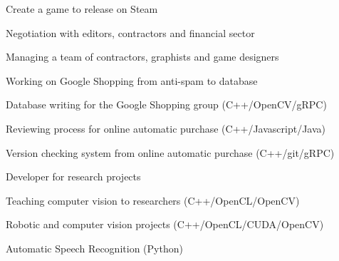 \documentclass[a4paper]{deedy-resume} %
\begin{document}
\begin{minipage}[t]{0.66\textwidth}
	Create a game to release on Steam
	\begin{tightitemize}
		\item Negotiation with editors, contractors and financial sector
		\item Managing a team of contractors, graphists and game designers
	\end{tightitemize}

\sectionspace %


	Working on Google Shopping from anti-spam to database
	\begin{tightitemize}
		\item Database writing for the Google Shopping group (C++/OpenCV/gRPC)
		\item Reviewing process for online automatic purchase (C++/Javascript/Java)
		\item Version checking system from online automatic purchase (C++/git/gRPC)
	\end{tightitemize}

\sectionspace %


	Developer for research projects
	\begin{tightitemize}
		\item Teaching computer vision to researchers (C++/OpenCL/OpenCV)
		\item Robotic and computer vision projects (C++/OpenCL/CUDA/OpenCV)
		\item Automatic Speech Recognition (Python)
	\end{tightitemize}

\sectionspace %


%


\end{minipage}
\end{document}
